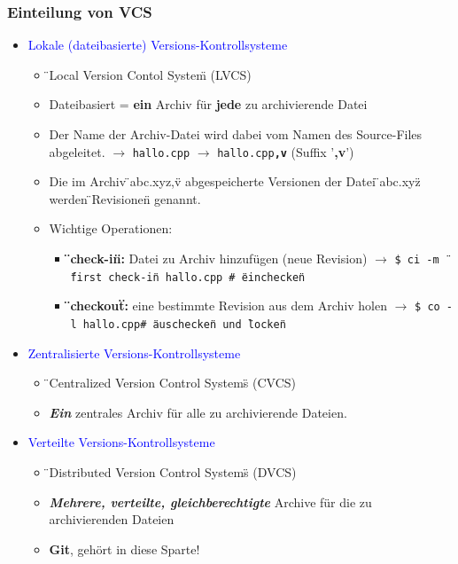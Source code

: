 \subsubsection{Einteilung von VCS}
	\begin{itemize}
\item \textcolor{blue}{Lokale (dateibasierte) Versions-Kontrollsysteme}
\begin{itemize}
\item \"{}Local Version Contol System\"{} (LVCS)
 \item Dateibasiert = \textbf{ein} Archiv für \textbf{jede} zu archivierende Datei
 \item Der Name der Archiv-Datei wird dabei vom Namen des Source-Files abgeleitet. \newline $\rightarrow$ \texttt{hallo.cpp} $\rightarrow$ \texttt{hallo.cpp\textbf{,v}} (Suffix '\textbf{,v}') 
 \item Die im Archiv \"{}abc.xyz,v\"{} abgespeicherte Versionen der Datei \"{}abc.xyz\"{} werden \"{}Revisionen\"{} genannt.
 \item Wichtige Operationen:
 \begin{itemize}
 	\item \textbf{\"{}check-in\"{}:} Datei zu Archiv hinzufügen (neue Revision) \newline $\rightarrow$ \texttt{\$ ci -m \"{}first check-in\"{} hallo.cpp \qquad \# \"{}einchecken\"{}}
 	\item \textbf{\"{}checkout\"{}:} eine bestimmte Revision aus dem Archiv holen \newline $\rightarrow$ \texttt{\$ co -l hallo.cpp\qquad \# \"{}auschecken\"{} und \"{}locken\"{}}
 \end{itemize}
\end{itemize}
\item \textcolor{blue}{Zentralisierte Versions-Kontrollsysteme}
\begin{itemize}
	\item \"{}Centralized Version Control Systems\"{} (CVCS)
	\item \textbf{\textit{Ein}} zentrales Archiv für alle zu archivierende Dateien. 
\end{itemize}
\item \textcolor{blue}{Verteilte Versions-Kontrollsysteme}
\begin{itemize}
	\item \"{}Distributed Version Control Systems\"{} (DVCS)
	\item \textbf{\textit{Mehrere, verteilte, gleichberechtigte}} Archive für die zu archivierenden Dateien
	\item \textbf{Git}, gehört in diese Sparte!
\end{itemize}
\end{itemize}
\clearpage
